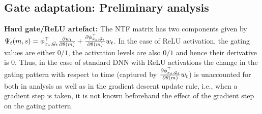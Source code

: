 \subsection{Gate adaptation: Preliminary analysis }

 \textbf{Hard gate/ReLU artefact:} 
The NTF matrix has two components given by $\Psi_t(m,s)={\phi_{x_s,\mathcal{G}_t }^\top\frac{\partial w_{t}} {\partial \theta(m)}+ \frac{\partial \phi_{x_s,\mathcal{G}_t }^\top}{\partial \theta(m)} w_{t}}$. In the case of ReLU activation, the gating values are either $0/1$, the activation levels are also $0/1$ and hence their derivative is $0$. Thus, in the case of standard DNN with ReLU activations the change in the gating pattern with respect to time (captured by $\frac{\partial \phi_{x_s,\mathcal{G}_t }^\top}{\partial \theta(m)} w_{t}$) is unaccounted for both in analysis as well as in the gradient descent update rule, i.e., when a gradient step is taken, it is not known beforehand the effect of the gradient step on the gating pattern. 

